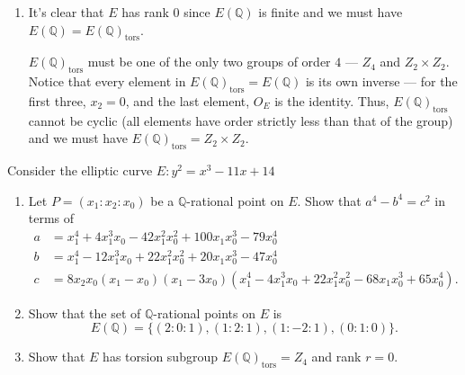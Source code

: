\documentclass[12 pt, letterpaper]{hmcpset}
\begin{document}
\begin{solution}
\begin{enumerate}
		\item It's clear that $E$ has rank $0$ since $E(\mathbb{Q})$ is finite and we must have $E(\mathbb{Q}) = E(\mathbb{Q})_{\text{tors}}$.

			$E(\mathbb{Q})_{\text{tors}}$ must be one of the only two groups of order $4$ --- $Z_{4}$ and $Z_{2} \times Z_{2}$. Notice that every element in $E(\mathbb{Q})_{\text{tors}} = E(\mathbb{Q})$ is its own inverse --- for the first three, $x_{2} = 0$, and the last element, $O_{E}$ is the identity. Thus, $E(\mathbb{Q})_{\text{tors}}$ cannot be cyclic (all elements have order strictly less than that of the group) and we must have $E(\mathbb{Q})_{\text{tors}} = Z_{2} \times Z_{2}$.
	\end{enumerate}
\end{solution}

\pagebreak

\begin{problem}[Problem 2.]
	Consider the elliptic curve $E : y^{2} = x^{3} - 11 x + 14$
	\begin{enumerate}
		\item Let $P = (x_{1} : x_{2} : x_{0})$ be a $\mathbb{Q}$-rational point on $E$. Show that $a^{4} - b^{4} = c^{2}$ in terms of
			\[
				\begin{split}
					a & = x_{1}^{4} + 4 x_{1}^{3} x_{0} - 42 x_{1}^{2} x_{0}^{2} + 100 x_{1} x_{0}^{3} - 79 x_{0}^{4} \\
					b & = x_{1}^{4} - 12 x_{1}^{3} x_{0} + 22 x_{1}^{2} x_{0}^{2} + 20 x_{1} x_{0}^{3} - 47 x_{0}^{4} \\
					c & = 8 x_{2} x_{0} (x_{1} - x_{0})(x_{1} - 3 x_{0})(x_{1}^{4} - 4 x_{1}^{3} x_{0} + 22 x_{1}^{2} x_{0}^{2} - 68 x_{1} x_{0}^{3} + 65 x_{0}^{4}).
				\end{split}
			\]
		\item Show that the set of $\mathbb{Q}$-rational points on $E$ is
			\[
				E(\mathbb{Q}) = \{ (2 : 0 : 1), (1 : 2 : 1), (1 : -2 : 1), (0 : 1 : 0) \}.
			\]
		\item Show that $E$ has torsion subgroup $E(\mathbb{Q})_{\text{tors}} = Z_{4}$ and rank $r = 0$.
	\end{enumerate}
\end{problem}
\end{document}
